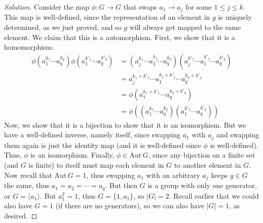 \documentclass{article}
\begin{document}
\begin{proof}[Solution]
	Consider the map $\phi \colon G \to G$
	that swaps $a_1 \to a_j$ for some $1 \leq j \leq k$.
	This map is well-defined,
	since the representation of an element in $g$ is uniquely determined,
	as we just proved,
	and so $g$ will always get mapped to the same element.
	We claim that this is a automorphism.
	First, we show that it is a homomorphism:
	\begin{align*}
		\phi(a_1^{k_1}\cdots a_q^{k_q})\phi(a_1^{k'_1}\cdots a_q^{k'_q})
		&= (a_j^{k_1}\cdots a_1^{k_j}\cdots a_q^{k_q})(a_j^{k'_1}\cdots a_1^{k'_j}\cdots a_q^{k'_q})\\
		&= a_j^{k_1 + k'_1}\cdots a_1^{k_j + k'_j}\cdots a_q^{k_q + k'_q} \\
		&= \phi(a_1^{k_1 + k'_1}\cdots a_q^{k_q + k'_q})\\
		&= \phi((a_1^{k_1}\cdots a_q^{k_q})(a_1^{k'_1}\cdots a_q^{k'_q}))
	\end{align*}
	Now, we show that it is a bijection to show that it is an isomorphism.
	But we have a well-defined inverse,
	namely itself, since swapping $a_1$ with $a_j$
	and swapping them again is just the identity map
	(and it is well-defined since $\phi$ is well-defined).
	Thus, $\phi$ is an isomorphism.
	Finally, $\phi \in \mathrm{Aut}\, G$,
	since any bijection on a finite set (and $G$ is finite)
	to itself must map each element in $G$ to another element in $G$.
	Now recall that $\mathrm{Aut}\,G = 1$,
	thus swapping $a_1$ with an arbitrary $a_j$
	keeps $g \in G$ the same,
	thus $a_1 = a_2 =\cdots = a_q$.
	But then $G$ is a group with only one generator,
	or $G = \langle a_1 \rangle$.
	But $a_1^2 = 1$,
	thus $G = \{1,a_1\}$, so $|G| = 2$.
	Recall earlier that we could also have $G = 1$ (if there are no generators),
	so we can also have $|G| = 1$, as desired.
\end{proof}
\end{document}
